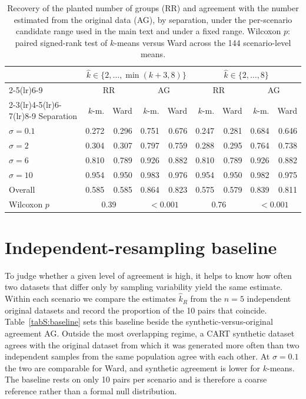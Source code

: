 \documentclass[pdflatex,sn-basic]{sn-jnl}
\begin{document}
\begin{table}[h]
\centering
\caption{Recovery of the planted number of groups (RR) and agreement with the
  number estimated from the original data (AG), by separation, under the
  per-scenario candidate range used in the main text and under a fixed range.
  Wilcoxon $p$: paired signed-rank test of $k$-means versus Ward across the 144
  scenario-level means.}
\label{tabS:range}
\small
\begin{tabular}{lrrrrrrrr}
\toprule
 & \multicolumn{4}{c}{$\hat{k} \in \{2,\dots,\min(k+3,8)\}$} & \multicolumn{4}{c}{$\hat{k} \in \{2,\dots,8\}$} \\
\cmidrule(lr){2-5}\cmidrule(lr){6-9}
 & \multicolumn{2}{c}{RR} & \multicolumn{2}{c}{AG} & \multicolumn{2}{c}{RR} & \multicolumn{2}{c}{AG} \\
\cmidrule(lr){2-3}\cmidrule(lr){4-5}\cmidrule(lr){6-7}\cmidrule(lr){8-9}
Separation & $k$-m. & Ward & $k$-m. & Ward & $k$-m. & Ward & $k$-m. & Ward \\
\midrule
$\sigma=0.1$ & 0.272 & 0.296 & 0.751 & 0.676 & 0.247 & 0.281 & 0.684 & 0.646 \\
$\sigma=2$ & 0.304 & 0.307 & 0.797 & 0.759 & 0.288 & 0.295 & 0.764 & 0.738 \\
$\sigma=6$ & 0.810 & 0.789 & 0.926 & 0.882 & 0.810 & 0.789 & 0.926 & 0.882 \\
$\sigma=10$ & 0.954 & 0.950 & 0.983 & 0.976 & 0.954 & 0.950 & 0.982 & 0.975 \\
\midrule
Overall & 0.585 & 0.585 & 0.864 & 0.823 & 0.575 & 0.579 & 0.839 & 0.811 \\
Wilcoxon $p$ & \multicolumn{2}{c}{0.39} & \multicolumn{2}{c}{$<0.001$} & \multicolumn{2}{c}{0.76} & \multicolumn{2}{c}{$<0.001$} \\
\bottomrule
\end{tabular}
\end{table}

\section{Independent-resampling baseline}

To judge whether a given level of agreement is high, it helps to know how
often two datasets that differ only by sampling variability yield the same
estimate. Within each scenario we compare the estimates $\hat{k}_R$ from the
$n = 5$ independent original datasets and record the proportion of the 10
pairs that coincide. Table~\ref{tabS:baseline} sets this baseline beside the
synthetic-versus-original agreement AG. Outside the most overlapping regime,
a CART synthetic dataset agrees with the original dataset from which it was
generated more often than two independent samples from the same population
agree with each other. At $\sigma = 0.1$ the two are comparable for Ward, and
synthetic agreement is lower for $k$-means. The baseline rests on only 10
pairs per scenario and is therefore a coarse reference rather than a formal
null distribution.
\end{document}
